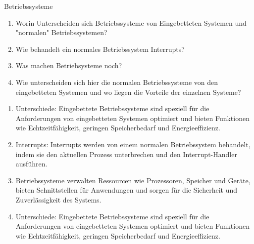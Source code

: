 \documentclass{article}
\begin{document}
\begin{exercise}{Betriebssysteme}
  \begin{enumerate}
    \item Worin Unterscheiden sich Betriebssysteme von Eingebetteten Systemen und "normalen" Betriebssystemen?
    \item Wie behandelt ein normales Betriebssystem Interrupts?
    \item Was machen Betriebsysteme noch?
    \item Wie unterscheiden sich hier die normalen Betriebssysteme von den eingebetteten Systemen und wo liegen die Vorteile der einzelnen Systeme?
  \end{enumerate}

  \begin{solution}
    \begin{enumerate}
      \item Unterschiede: Eingebettete Betriebssysteme sind speziell für die Anforderungen von eingebetteten Systemen optimiert und bieten Funktionen wie Echtzeitfähigkeit, geringen Speicherbedarf und Energieeffizienz.
      \item Interrupts: Interrupts werden von einem normalen Betriebssystem behandelt, indem sie den aktuellen Prozess unterbrechen und den Interrupt-Handler ausführen.
      \item Betriebssysteme verwalten Ressourcen wie Prozessoren, Speicher und Geräte, bieten Schnittstellen für Anwendungen und sorgen für die Sicherheit und Zuverlässigkeit des Systems.
      \item Unterschiede: Eingebettete Betriebssysteme sind speziell für die Anforderungen von eingebetteten Systemen optimiert und bieten Funktionen wie Echtzeitfähigkeit, geringen Speicherbedarf und Energieeffizienz.
    \end{enumerate}
  \end{solution}
\end{exercise}
\end{document}
